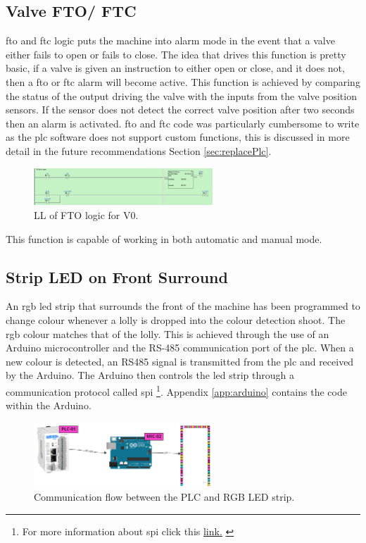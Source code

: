     \subsection{Valve FTO/ FTC} \label{sec:valveFtoFtc}
        \acrfull{fto} and \acrfull{ftc} logic puts the machine into alarm mode in the event that a valve either fails to open or fails to close. The idea that drives this function is pretty basic, if a valve is given an instruction to either open or close, and it does not, then a \acrshort{fto} or \acrshort{ftc} alarm will become active. This function is achieved by comparing the status of the output driving the valve with the inputs from the valve position sensors. If the sensor does not detect the correct valve position after two seconds then an alarm is activated. \acrshort{fto} and \acrshort{ftc} code was particularly cumbersome to write as the \acrshort{plc} software does not support custom functions, this is discussed in more detail in the future recommendations Section \ref{sec:replacePlc}.

        \begin{figure}[H]
            \centering
            \includegraphics[width = 0.6\textwidth]{2_images/ftoLl}
            \caption{LL of FTO logic for V0.}
            \label{fig:ftoLl}
        \end{figure}          
        This function is capable of working in both automatic and manual mode.   
        
    \subsection{Strip LED on Front Surround} \label{sec:stripLed}
        An \acrshort{rgb} \acrshort{led} strip that surrounds the front of the machine has been programmed to change colour whenever a lolly is dropped into the colour detection shoot. The \acrshort{rgb} colour matches that of the lolly. This is achieved through the use of an Arduino microcontroller and the RS-485 communication port of the \acrshort{plc}. When a new colour is detected, an RS485 signal is transmitted from the \acrshort{plc} and received by the Arduino. The Arduino then controls the \acrshort{led} strip through a communication protocol called \acrshort{spi} \footnote{For more information about \acrshort{spi} click this \href{https://learn.sparkfun.com/tutorials/serial-peripheral-interface-spi/all}{link.} \cite{spi}}. Appendix \ref{app:arduino} contains the code within the Arduino.

        \begin{figure}[H]
            \centering
            \includegraphics[width = 0.6\textwidth]{2_images/rgbStrip}
            \caption{Communication flow between the PLC and RGB LED strip.}
            \label{fig:rgbStrip}
        \end{figure} 
